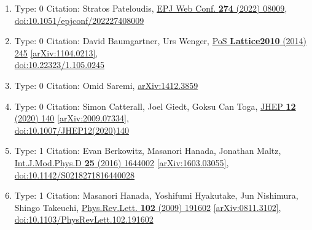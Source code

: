 \documentclass[a4paper,10pt]{article}
\begin{document}
\begin{enumerate}
\begin{enumerate}
  \item Type: 0 Citation: Stratos Pateloudis, \href{https://www.doi.org/10.1051/epjconf/202227408009}{EPJ Web Conf. {\bf 274} (2022) 08009},\\\href{https://www.doi.org/10.1051/epjconf/202227408009}{doi:10.1051/epjconf/202227408009}
  \item Type: 0 Citation: David Baumgartner, Urs Wenger, \href{https://www.doi.org/10.22323/1.105.0245}{PoS {\bf Lattice2010} (2014) 245}  \href{https://arxiv.org/abs/1104.0213}{[arXiv:1104.0213]},\\\href{https://www.doi.org/10.22323/1.105.0245}{doi:10.22323/1.105.0245}
  \item Type: 0 Citation: Omid Saremi, \href{https://arxiv.org/abs/1412.3859}{arXiv:1412.3859}
  \item Type: 0 Citation: Simon Catterall, Joel Giedt, Goksu Can Toga, \href{https://www.doi.org/10.1007/JHEP12(2020)140}{JHEP {\bf 12} (2020) 140}  \href{https://arxiv.org/abs/2009.07334}{[arXiv:2009.07334]},\\\href{https://www.doi.org/10.1007/JHEP12(2020)140}{doi:10.1007/JHEP12(2020)140}
  \item Type: 1 Citation: Evan Berkowitz, Masanori Hanada, Jonathan Maltz, \href{https://www.doi.org/10.1142/S0218271816440028}{Int.J.Mod.Phys.D {\bf 25} (2016) 1644002}  \href{https://arxiv.org/abs/1603.03055}{[arXiv:1603.03055]},\\\href{https://www.doi.org/10.1142/S0218271816440028}{doi:10.1142/S0218271816440028}
  \item Type: 1 Citation: Masanori Hanada, Yoshifumi Hyakutake, Jun Nishimura, Shingo Takeuchi, \href{https://www.doi.org/10.1103/PhysRevLett.102.191602}{Phys.Rev.Lett. {\bf 102} (2009) 191602}  \href{https://arxiv.org/abs/0811.3102}{[arXiv:0811.3102]},\\\href{https://www.doi.org/10.1103/PhysRevLett.102.191602}{doi:10.1103/PhysRevLett.102.191602}

\end{enumerate}
\end{enumerate}
\end{document}
